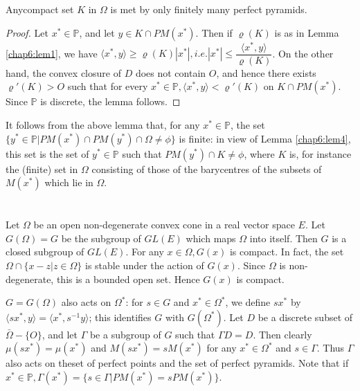 \begin{lem}\label{chap6:lem7}%
  Any\pageoriginale compact set $K$ in $\Omega$ is met by only
  finitely many perfect pyramids. 
\end{lem}

\begin{proof}
  Let $x^* \in \mathbb{P}$, and let $y \in K \cap PM (x^*)$. Then if
  $\varrho (K)$ is as in Lemma \ref{chap6:lem1}, we have $ \langle
  x^*,y \rangle \geq 
  \varrho (K) | x^*|, i.e.|x^*| \leq \dfrac{ \langle
    x^*,y\rangle}{\varrho (K)}$. On the other hand, the convex closure
  of $D$ does not contain $O$, and hence there exists $\varrho'(K) > O$
  such that for every $x^* \in \mathbb{P}, \langle x^*,y \rangle <
  \varrho' (K)$ on $K \cap PM (x^*)$. Since $\mathbb{P}$ is discrete,
  the lemma follows. 
\end{proof}

\begin{remark*}
  It follows from the above lemma that, for any $x^* \in \mathbb{P}$,
  the set $\{ y^* \in \mathbb{P}|PM (x^*) \cap PM(y^*) \cap \Omega
  \neq \phi \}$ is finite: in view of Lemma \ref{chap6:lem4}, this set is the set
  of $y^* \in \mathbb{P}$ such that $PM(y^*) \cap K \neq \phi $, where
  $K$ is, for instance the (finite) set in $\Omega$ consisting of
  those of the barycentres of the subsets of $M(x^*)$ which lie in
  $\Omega$. 
\end{remark*}

\section{}%

Let $\Omega$ be an open non-degenerate convex cone in a real vector
space $E$.  Let $G(\Omega)=G$ be the subgroup of $GL(E)$ which maps
$\Omega$ into itself. Then $G$ is a closed subgroup of $GL(E)$. For
any $x \in \Omega, G(x)$ is compact. In fact, the set $\Omega \cap \{
x-z|z \in \Omega \}$ is stable under the action of $G(x)$.  Since
$\Omega$ is non-degenerate, this is a bounded open set. Hence $G(x)$
is compact. 

$G=G(\Omega)$ also acts on $\Omega^*$: for $s \in G$ and $x^* \in
\Omega^*$, we define $sx^*$ by $\langle sx^* ,y \rangle =\langle
x^*,s^{-1}y \rangle $; this identifies $G$ with $G(\Omega^*)$. Let $D$
be a discrete subset of $\bar{\Omega} - \{O\}$, and let $\Gamma$ be a
subgroup of $G$ such that $\Gamma D =D$. Then clearly $\mu(sx^*)=\mu
(x^*)$ and $M(sx^*)=sM(x^*)$ for any $x^* \in \Omega^*$ and $s \in
\Gamma$. Thus $\Gamma $ also acts on the\pageoriginale set of perfect
points and the 
set of perfect pyramids. Note that if $x^* \in \mathbb{P}, \Gamma
(x^*)=\{ s \in \Gamma | PM (x^*)=s PM (x^*)\}$. 

